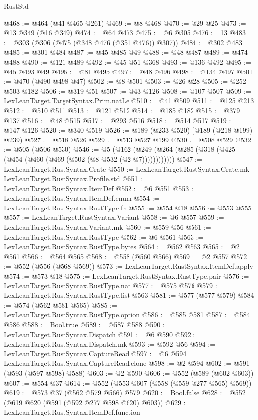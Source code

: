 \begin{lexlean}{RustStd}
\begin{coremodule}
{\begin{coremodule}
{{{{{{{{{{{{{{{@468 := @464 (@41 @465 @261)
@469 := @8 @468
@470 := @29 @25
@473 := @13 @349 (@16 @349)
@474 := @64 @473
@475 := @6 @305
@476 := 13
@483 := @303 (@306 (@475 (@348 @476 (@351 @476)) @307))
@484 := @302 @483
@485 := @301 @484
@487 := @45 @485 @49
@488 := @48 @487
@489 := @474 @488
@490 := @121 @489
@492 := @45 @51 @368
@493 := @136 @492
@495 := @45 @493 @49
@496 := @81 @495
@497 := @48 @496
@498 := @134 @497
@501 := @470 (@490 @498 @47)
@502 := @8 @501
@503 := @26 @28
@505 := @252 @503 @182
@506 := @319 @51
@507 := @43 @126
@508 := @107 @507
@509 := LexLeanTarget.TargetSyntax.Prim.natLe
@510 := @41 @509
@511 := @125 @213
@512 := @510 @511
@513 := @121 @512
@514 := @185 @182
@515 := @379 @137
@516 := @48 @515
@517 := @293 @516
@518 := @514 @517
@519 := @147 @126
@520 := @340 @519
@526 := @189 (@233 @520) (@189 (@218 @199) @239)
@527 := @518 @526
@529 := @513 @527 @199
@530 := @508 @529
@532 := @505 (@506 @530)
@546 := @5 (@162 (@249 (@264 (@285 (@318 (@425 (@454 (@460 (@469 (@502 (@8 @532 (@2 @7))))))))))))
@547 := LexLeanTarget.RustSyntax.Crate
@550 := LexLeanTarget.RustSyntax.Crate.mk LexLeanTarget.RustSyntax.Profile.std
@551 := LexLeanTarget.RustSyntax.ItemDef
@552 := @6 @551
@553 := LexLeanTarget.RustSyntax.ItemDef.enum
@554 := LexLeanTarget.RustSyntax.RustType.fn
@555 := @554 @18
@556 := @553 @555
@557 := LexLeanTarget.RustSyntax.Variant
@558 := @6 @557
@559 := LexLeanTarget.RustSyntax.Variant.mk
@560 := @559 @56
@561 := LexLeanTarget.RustSyntax.RustType
@562 := @6 @561
@563 := LexLeanTarget.RustSyntax.RustType.bytes
@564 := @562 @563
@565 := @2 @561
@566 := @564 @565
@568 := @558 (@560 @566)
@569 := @2 @557
@572 := @552 (@556 (@568 @569))
@573 := LexLeanTarget.RustSyntax.ItemDef.apply
@574 := @573 @18
@575 := LexLeanTarget.RustSyntax.RustType.pair
@576 := LexLeanTarget.RustSyntax.RustType.nat
@577 := @575 @576
@579 := LexLeanTarget.RustSyntax.RustType.list @563
@581 := @577 (@577 @579)
@584 := @574 (@562 @581 @565)
@585 := LexLeanTarget.RustSyntax.RustType.option
@586 := @585 @581
@587 := @584 @586
@588 := Bool.true
@589 := @587 @588
@590 := LexLeanTarget.RustSyntax.Dispatch
@591 := @6 @590
@592 := LexLeanTarget.RustSyntax.Dispatch.mk
@593 := @592 @56
@594 := LexLeanTarget.RustSyntax.CaptureRead
@597 := @6 @594 LexLeanTarget.RustSyntax.CaptureRead.clone
@598 := @2 @594
@602 := @591 (@593 (@597 @598) @588)
@603 := @2 @590
@606 := @552 (@589 (@602 @603))
@607 := @554 @37
@614 := @552 (@553 @607 (@558 (@559 @277 @565) @569))
@619 := @573 @37 (@562 @579 @566) @579
@620 := Bool.false
@628 := @552 (@619 @620 (@591 (@592 @277 @598 @620) @603))
@629 := LexLeanTarget.RustSyntax.ItemDef.function
}}}}}}}}}}}}}}}
\end{coremodule}}
\end{coremodule}
\end{lexlean}
